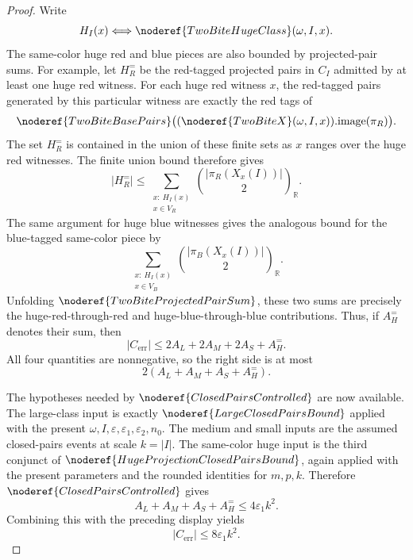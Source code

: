 \begin{proof}
Write
\[
H_I(x)\Longleftrightarrow \noderef{TwoBiteHugeClass}(\omega,I,x).
\]
The same-color huge red and blue pieces are also bounded by projected-pair
sums.  For example, let \(H_R^{=}\) be the red-tagged projected pairs in
\(C_I\) admitted by at least one huge red witness.  For each huge red witness
\(x\), the red-tagged pairs generated by this particular witness are exactly
the red tags of
\[
\noderef{TwoBiteBasePairs}
\bigl((\noderef{TwoBiteX}(\omega,I,x)).\mathrm{image}(\pi_R)\bigr).
\]
The set \(H_R^{=}\) is contained in the union of these finite sets as \(x\)
ranges over the huge red witnesses.  The finite union bound therefore gives
\[
|H_R^{=}|
\le
\sum_{\substack{x:\ H_I(x)\\ x\in V_R}}
  \binom{|\pi_R(X_x(I))|}{2}_{\mathbb R}.
\]
The same argument for huge blue witnesses gives the analogous bound for the
blue-tagged same-color piece by
\[
\sum_{\substack{x:\ H_I(x)\\ x\in V_B}}
  \binom{|\pi_B(X_x(I))|}{2}_{\mathbb R}.
\]
Unfolding \(\noderef{TwoBiteProjectedPairSum}\), these two sums are precisely
the huge-red-through-red and huge-blue-through-blue contributions.  Thus, if
\(A_H^{=}\) denotes their sum, then
\[
|C_{\mathrm{err}}|\le 2A_L+2A_M+2A_S+A_H^{=}.
\]
All four quantities are nonnegative, so the right side is at most
\[
2(A_L+A_M+A_S+A_H^{=}).
\]

The hypotheses needed by \(\noderef{ClosedPairsControlled}\) are now
available.  The large-class input is exactly
\(\noderef{LargeClosedPairsBound}\) applied with the present
\(\omega,I,\varepsilon,\varepsilon_1,\varepsilon_2,n_0\).  The medium and
small inputs are the assumed closed-pairs events at scale \(k=|I|\).  The
same-color huge input is the third conjunct of
\(\noderef{HugeProjectionClosedPairsBound}\), again applied with the present
parameters and the rounded identities for \(m,p,k\).  Therefore
\(\noderef{ClosedPairsControlled}\) gives
\[
A_L+A_M+A_S+A_H^{=}\le 4\varepsilon_1k^2.
\]
Combining this with the preceding display yields
\[
|C_{\mathrm{err}}|\le 8\varepsilon_1k^2. \tag{3}
\]


\end{proof}
